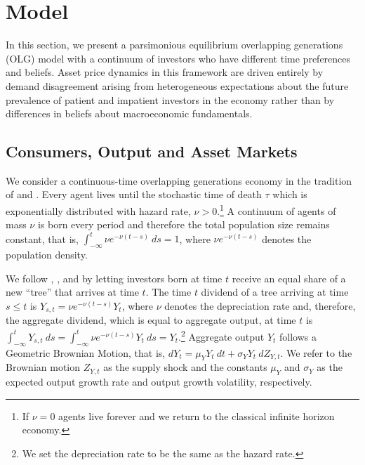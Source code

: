 \documentclass[preprint,11pt,authoryear]{elsarticle}
\theoremstyle{plain}
\begin{document}
\section{Model}\label{sec:Model}


In this section, we present a parsimonious equilibrium overlapping generations (OLG) model with a continuum of investors who have different time preferences and beliefs. Asset price dynamics in this framework are driven entirely by demand disagreement arising from heterogeneous expectations about the future prevalence of patient and impatient investors in the economy rather than by differences in beliefs about macroeconomic fundamentals.

\subsection{Consumers, Output and Asset Markets}\label{sec:consumers}

We consider a continuous-time overlapping generations economy in the tradition of \cite{Blanchard2013} and \cite{Garleanu2008}.  Every agent lives until the stochastic time of death $\tau$ which is exponentially distributed with hazard rate, $\nu > 0$.\footnote{If $\nu=0$ agents live forever and we return to the classical infinite horizon economy.}  A continuum of agents of mass $\nu$ is born every period and therefore the total population size remains constant, that is, $\int^{t}_{-\infty}\nu e^{-\nu\left(t-s\right)}  \: ds = 1$, where $\nu e^{-\nu\left(t-s\right)}$ denotes the population density.  

We follow \cite{GarlenauKoganPanageas2012}, \cite{panageas:2020}, and \cite{GPG:2021} by letting investors born at time $t$ receive an equal share of a new ``tree'' that arrives at time $t$. The time $t$ dividend of a tree arriving at time $s \leq t$ is $Y_{s,t} = \nu e^{-\nu\left(t-s\right)}Y_t$, 
where $\nu$ denotes the depreciation rate and, therefore, the aggregate dividend, which is equal to aggregate output, at time $t$ is $\int^{t}_{-\infty}Y_{s,t} \: ds = \int^{t}_{-\infty}\nu e^{-\nu\left(t-s\right)}Y_t \: ds = Y_t.$\footnote{We set the depreciation rate to be the same as the hazard rate.} Aggregate output $Y_t$ follows a Geometric Brownian Motion, that is, $dY_{t} = \mu_{Y} Y_{t} \: dt + \sigma_{Y} Y_{t} \: dZ_{Y,t}$.
We refer to the Brownian motion $Z_{Y,t}$ as the supply shock and the constants $\mu_Y$ and $\sigma_Y$ as the expected output growth rate and output growth volatility, respectively. 
\end{document}
